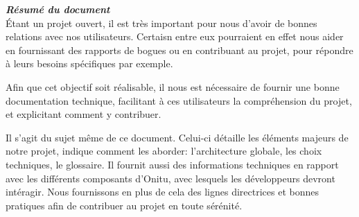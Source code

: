 \thispagestyle{empty}
\vspace*{10mm}

\textbf{\emph{\textcolor{onitu}{\large{Résumé du document} } } }\\

Étant un projet ouvert, il est très important pour nous d'avoir de bonnes relations avec nos utilisateurs. Certaisn entre eux pourraient en effet nous aider en fournissant des rapports de bogues ou en contribuant au projet, pour répondre à leurs besoins spécifiques par exemple.

Afin que cet objectif soit réalisable, il nous est nécessaire de fournir une bonne documentation technique, facilitant à ces utilisateurs la compréhension du projet, et explicitant comment y contribuer.

Il s'agit du sujet même de ce document. Celui-ci détaille les éléments majeurs de notre projet, indique comment les aborder: l'architecture globale, les choix techniques, le glossaire. Il fournit aussi des informations techniques  en rapport avec les différents composants d'Onitu, avec lesquels les développeurs devront intéragir. Nous fournissons en plus de cela des lignes directrices et bonnes pratiques afin de contribuer au projet en toute sérénité.

\clearpage
